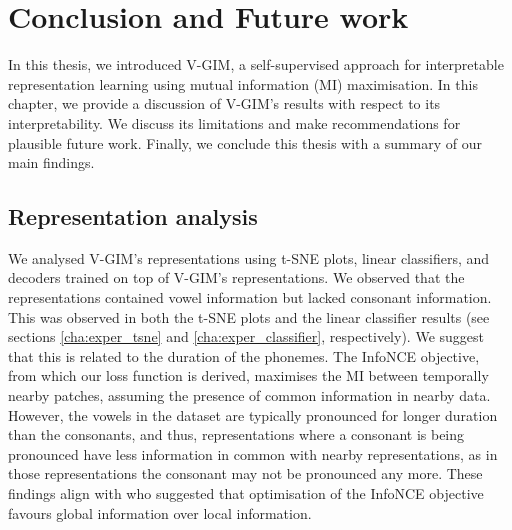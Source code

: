 \chapter{Conclusion and Future work} \label{cha:6}

	
In this thesis, we introduced V-GIM, a self-supervised approach for interpretable representation learning using mutual information (MI) maximisation. In this chapter, we provide a discussion of V-GIM's results with respect to its interpretability. We discuss its limitations and make recommendations for plausible future work. Finally, we conclude this thesis with a summary of our main findings.




\section{Representation analysis} \label{cha:disc_repr_anal}
	
	We analysed V-GIM's representations using t-SNE plots, linear classifiers, and decoders trained on top of V-GIM's representations. We observed that the representations contained vowel information but lacked consonant information. This was observed in both the t-SNE plots and the linear classifier results (see sections \ref{cha:exper_tsne} and \ref{cha:exper_classifier}, respectively). We suggest that this is related to the duration of the phonemes. The InfoNCE objective, from which our loss function is derived, maximises the MI between temporally nearby patches, assuming the presence of common information in nearby data. However, the vowels in the dataset are typically pronounced for longer duration than the consonants, and thus, representations where a consonant is being pronounced have less information in common with nearby representations, as in those representations the consonant may not be pronounced any more. These findings align with \cite{lowePuttingEndEndtoEnd2020a} who suggested that optimisation of the InfoNCE objective favours global information over local information. 
	
